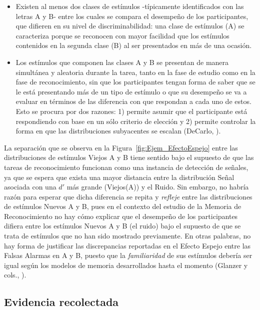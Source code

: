 \begin{itemize}
\item Existen al menos dos clases de estímulos -típicamente identificados con las letras A y B- entre los cuales se compara el desempeño de los participantes, que difieren en su nivel de discriminabilidad: una clase de estímulos (A) se caracteriza porque se reconocen con mayor facilidad que los estímulos contenidos en la segunda clase (B) al ser presentados en más de una ocasión.\\

\item Los estímulos que componen las clases A y B se presentan de manera simultánea y aleatoria durante la tarea, tanto en la fase de estudio como en la fase de reconocimiento, sin que los participantes tengan forma de saber que se le está presentando más de un tipo de estímulo o  que su desempeño se va a evaluar en términos de las diferencia con que respondan a cada uno de estos. Esto se procura por dos razones: 1) permite asumir que el participante está respondiendo con base en un sólo criterio de elección y 2) permite controlar la forma en que las distribuciones subyacentes se escalan (DeCarlo, \citeyear{DeCarlo2007}).\\
\end{itemize}

La separación que se observa en la Figura~\ref{fig:Ejem_EfectoEspejo} entre las distribuciones de estímulos Viejos A y B tiene sentido bajo el supuesto de que las tareas de reconocimiento funcionan como una instancia de detección de señales, ya que se espera que exista una mayor distancia entre la distribución Señal asociada con una $d'$ más grande (Viejos(A)) y el Ruido. Sin embargo, no habría razón para esperar que dicha diferencia se repita y \textit{refleje} entre las distribuciones de estímulos Nuevos A y B, pues en el contexto del estudio de la Memoria de Reconocimiento no hay cómo explicar que el desempeño de los participantes difiera entre los estímulos Nuevos A y B (el ruido) bajo el supuesto de que se trata de estímulos que no han sido mostrado previamente. En otras palabras, no hay forma de justificar las discrepancias reportadas en el Efecto Espejo entre las Falsas Alarmas en A y B, puesto que la \textit{familiaridad} de sus estímulos debería ser igual según los modelos de memoria desarrollados hasta el momento (Glanzer y cols., \citeyear{Glanzer1993}).\\

\subsection{Evidencia recolectada}

